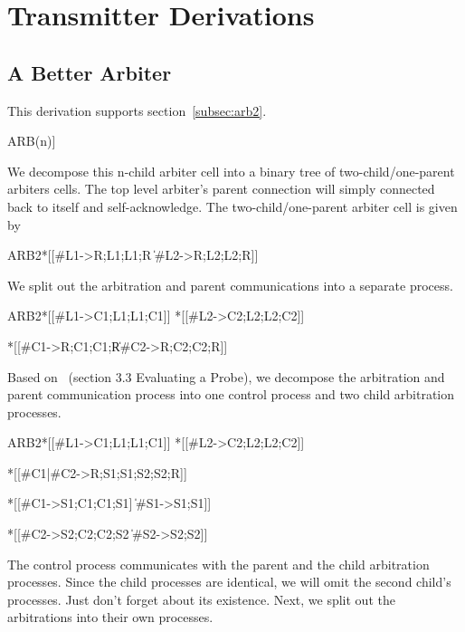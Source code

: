 \documentclass[aer.tex]{subfiles}
\begin{document}
\section{Transmitter Derivations}

\subsection{A Better Arbiter}
\label{subsec:arb2_derivation}

This derivation supports section~\ref{subsec:arb2}.

\begin{csp}
ARB(n)\equiv*[[\langle\|i:1..n:#{Li}->Li;Li\rangle]]
\end{csp}

We decompose this n-child arbiter cell into a binary tree of two-child/one-parent arbiters cells.
The top level arbiter's parent connection will simply connected back to itself and self-acknowledge.
The two-child/one-parent arbiter cell is given by

\begin{csp}
ARB2\equiv*
  *[[#{L1}->R;L1;L1;R
    \|#{L2}->R;L2;L2;R]]
\end{csp}

\noindent We split out the arbitration and parent communications into a separate process.

\begin{csp}
ARB2\equiv*
  *[[#{L1}->C1;L1;L1;C1]] \pll
  *[[#{L2}->C2;L2;L2;C2]] \pll
  
  *[[#{C1}->R;C1;C1;R\|#{C2}->R;C2;C2;R]]
\end{csp}

Based on~\cite{precise_exceptions} (section 3.3 Evaluating a Probe),
we decompose the arbitration and parent communication process into
one control process and two child arbitration processes.

\begin{csp}
ARB2\equiv*
  *[[#{L1}->C1;L1;L1;C1]] \pll
  *[[#{L2}->C2;L2;L2;C2]] \pll

  *[[#{C1}|#{C2}->R;S1;S1;S2;S2;R]] \pll

  *[[#{C1}->S1;C1;C1;S1]
    \|#{S1}->S1;S1]] \pll
  
  *[[#{C2}->S2;C2;C2;S2
    \|#{S2}->S2;S2]] \pll
\end{csp}

The control process communicates with the parent and the child arbitration processes.
Since the child processes are identical, we will omit the second child's processes.
Just don't forget about its existence.
Next, we split out the arbitrations into their own processes. 
\end{document}
